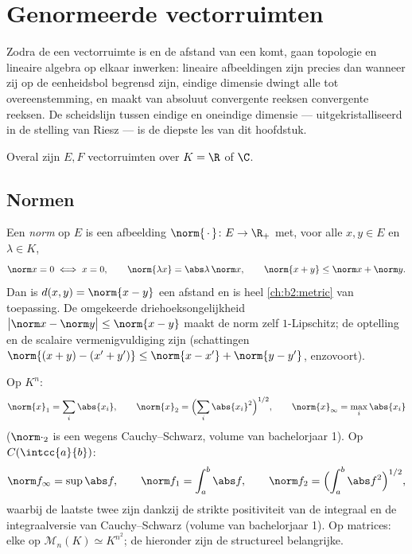 \chapter{Genormeerde vectorruimten}\label{ch:b2:nvs}

Zodra de  een vectorruimte is en de afstand van een
 komt, gaan topologie en lineaire algebra op elkaar inwerken:
lineaire afbeeldingen zijn precies dan  wanneer zij op de
eenheidsbol begrensd zijn, eindige dimensie dwingt alle  tot
overeenstemming, en  maakt van absoluut convergente
reeksen convergente reeksen. De scheidslijn tussen eindige en
oneindige dimensie --- uitgekristalliseerd in de stelling van
Riesz --- is de diepste les van dit hoofdstuk.

Overal zijn $E, F$ vectorruimten over $K = \R$ of $\C$.

\section{Normen}

\begin{definition}\label{def:b2:nvs:norm}
Een \emph{norm} op $E$ is een afbeelding
$\norm{\,\cdot\,} \colon E \to \R_+$ met, voor alle $x, y \in E$ en
$\lambda \in K$,
\[
\norm x = 0 \iff x = 0,
\qquad
\norm{\lambda x} = \abs\lambda\,\norm x,
\qquad
\norm{x + y} \leq \norm x + \norm y .
\]
Dan is $d(x, y) = \norm{x - y}$ een afstand en is heel
\cref{ch:b2:metric} van toepassing. De omgekeerde
driehoeksongelijkheid $\bigl|\norm x - \norm y\bigr| \leq \norm{x -
y}$ maakt de norm zelf $1$-Lipschitz; de optelling en de
scalaire vermenigvuldiging zijn  (schattingen $\norm{(x + y)
- (x' + y')} \leq \norm{x - x'} + \norm{y - y'}$, enzovoort).
\end{definition}

\begin{example}\label{ex:b2:nvs:examples}
Op $K^n$:
\[
\norm{x}_1 = \sum_i \abs{x_i},
\qquad
\norm{x}_2 = \Bigl(\sum_i \abs{x_i}^2\Bigr)^{1/2},
\qquad
\norm{x}_\infty = \max_i \abs{x_i}
\]
($\norm\cdot_2$ is een  wegens Cauchy--Schwarz, volume van
bachelorjaar 1). Op $C(\intcc{a}{b})$:
\[
\norm f_\infty = \sup \abs f,
\qquad
\norm f_1 = \int_a^b \abs f,
\qquad
\norm f_2 = \Bigl(\int_a^b \abs f^2\Bigr)^{1/2},
\]
waarbij de laatste twee  zijn dankzij de strikte positiviteit
van de integraal en de integraalversie van Cauchy--Schwarz (volume
van bachelorjaar 1). Op matrices: elke  op $\mathcal M_n(K)
\simeq K^{n^2}$; de  hieronder zijn de structureel
belangrijke.
\end{example}

